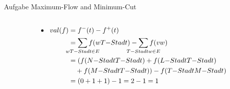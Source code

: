 \begin{frame}[allowframebreaks]{Aufgabe \thesection}{Maximum-Flow and Minimum-Cut}
\begin{requirementsnoinc}
\begin{columns}
\begin{column}{0.5\textwidth}
{\begin{minipage}[t]{8cm}
          \end{minipage}
        }
      \end{column}
    \end{columns}
  \end{requirementsnoinc}
  \framebreak
  \begin{solution}
    \begin{columns}
      \begin{column}{0.4\textwidth}
      \end{column}
      \begin{column}{0.6\textwidth}
        \begin{itemize}
          \tiny
          \item $\begin{aligned}[t]\displaystyle val(f) &= f^-(t) - f^+(t)\\
            &= \sum_{\mathclap{\substack{w T-Stadt\in E}}} f(w T{-}Stadt) - \sum_{\mathclap{\substack{T{-}Stadt w\in E}}} f(vw)\\
            &= (f(N{-}Stadt T{-}Stadt) + f(L{-}Stadt T{-}Stadt) \\
            &\quad + f(M{-}Stadt T{-}Stadt)) - f(T{-}Stadt M{-}Stadt)\\
            &= (0 + 1 + 1 ) - 1 = 2 - 1 = 1\\
          \end{aligned}$
        \end{itemize}
      \end{column}
    \end{columns}
  \end{solution}
  \begin{solution}
    \begin{columns}
      \begin{column}{0.5\textwidth}
      \end{column}
      \begin{column}{0.5\textwidth}
\end{column}
\end{columns}
\end{solution}
\end{frame}
